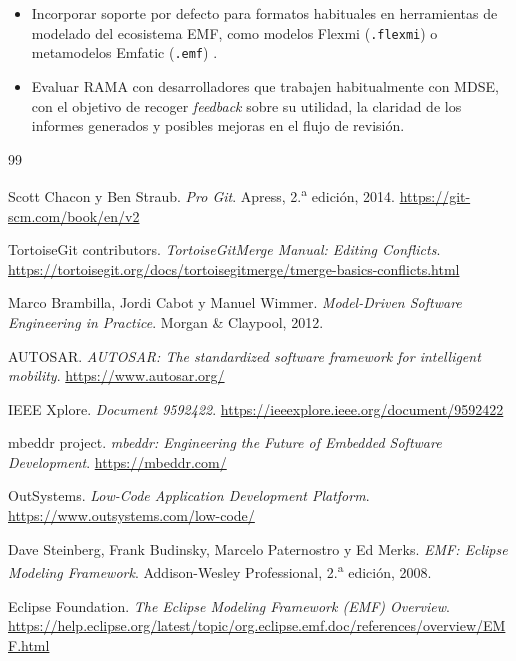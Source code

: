 \documentclass[11pt]{article}
\begin{document}
\begin{itemize}
    \item Incorporar soporte por defecto para formatos habituales en herramientas de modelado del ecosistema EMF, como modelos Flexmi (\texttt{.flexmi}) \cite{Flexmi} o metamodelos Emfatic (\texttt{.emf}) \cite{emfatic}.
    \item Evaluar RAMA con desarrolladores que trabajen habitualmente con MDSE, con el objetivo de recoger \textit{feedback} sobre su utilidad, la claridad de los informes generados y posibles mejoras en el flujo de revisión.
\end{itemize}

\newpage


\begin{thebibliography}{99}

Scott Chacon y Ben Straub.
\textit{Pro Git}.
Apress, 2.\textsuperscript{a} edición, 2014.
\url{https://git-scm.com/book/en/v2}

TortoiseGit contributors.
\textit{TortoiseGitMerge Manual: Editing Conflicts}.
\url{https://tortoisegit.org/docs/tortoisegitmerge/tmerge-basics-conflicts.html}

Marco Brambilla, Jordi Cabot y Manuel Wimmer.
\textit{Model-Driven Software Engineering in Practice}.
Morgan \& Claypool, 2012.

AUTOSAR.
\textit{AUTOSAR: The standardized software framework for intelligent mobility}.
\url{https://www.autosar.org/}

IEEE Xplore.
\textit{Document 9592422}.
\url{https://ieeexplore.ieee.org/document/9592422}

mbeddr project.
\textit{mbeddr: Engineering the Future of Embedded Software Development}.
\url{https://mbeddr.com/}

OutSystems.
\textit{Low-Code Application Development Platform}.
\url{https://www.outsystems.com/low-code/}

Dave Steinberg, Frank Budinsky, Marcelo Paternostro y Ed Merks.
\textit{EMF: Eclipse Modeling Framework}.
Addison-Wesley Professional, 2.\textsuperscript{a} edición, 2008.

Eclipse Foundation.
\textit{The Eclipse Modeling Framework (EMF) Overview}.
\url{https://help.eclipse.org/latest/topic/org.eclipse.emf.doc/references/overview/EMF.html}


\end{thebibliography}
\end{document}
